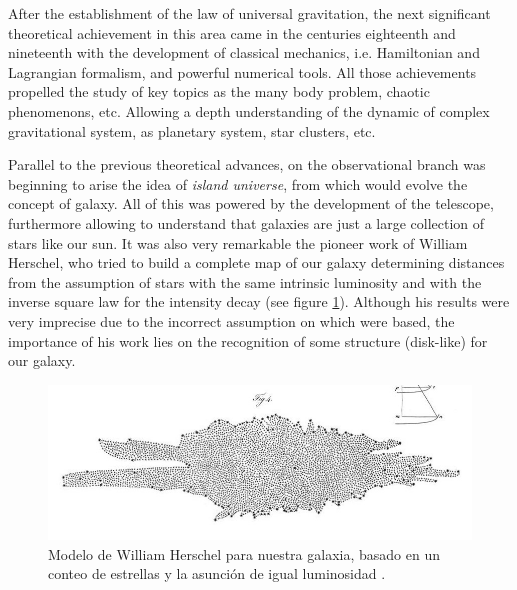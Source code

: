 After the establishment of the law of universal gravitation, the next 
significant theo\-retical achievement in this area came in the centuries 
eighteenth and nineteenth with the development of classical mechanics, i.e.
Hamiltonian and Lagrangian formalism, and powerful numerical tools. All
those achievements propelled the study of key topics as the many body 
problem, chaotic phenomenons, etc. Allowing a depth understanding of the 
dynamic of complex gravitational system, as planetary system, star 
clusters, etc. 


Parallel to the previous theoretical advances, on the observational branch 
was beginning to arise the idea of \textit{island universe}, from which 
would evolve the concept of galaxy. All of this was powered by the 
development of the telescope, furthermore allowing to understand that  
galaxies are just a large collection of stars like our sun. It was also 
very remarkable the pioneer work of William Herschel, who tried to build a
complete map of our galaxy determining distances from the assumption of 
stars with the same intrinsic luminosity and with the inverse square law 
for the intensity decay (see figure \ref{fig:HerschelModel}). 
Although his results were very imprecise due to the incorrect assumption 
on which were based, the importance of his work lies on the recognition of 
some structure (disk-like) for our galaxy. 


\begin{figure}[htbp]
	\centering
	\includegraphics[width=1.0\textwidth]
	{./figures/1_introduction/Herschel_Model.png}
	
	\caption{\small{Modelo de William Herschel para nuestra galaxia, basado
	en un conteo de estrellas y la asunción de igual luminosidad 
	\cite{Herschel1785}.}}
	
	\label{fig:HerschelModel}
\end{figure}



